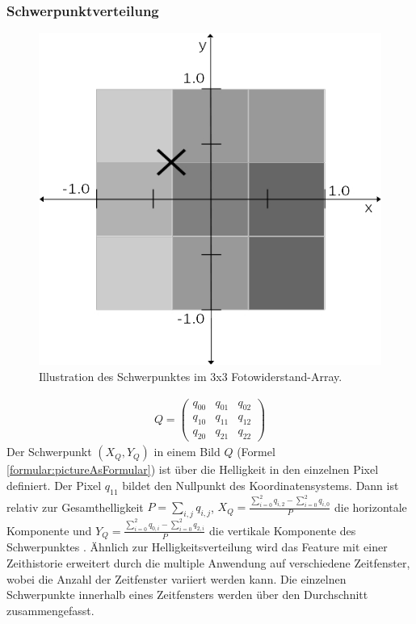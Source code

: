 \subsubsection{Schwerpunktverteilung}
\label{sec:schwerpunktverteilung}
\begin{figure}
    \centering
    \includegraphics[width=0.5\linewidth]{images/schwerpunkt_ansatz.jpg}
    \caption{Illustration des Schwerpunktes im 3x3 Fotowiderstand-Array.}
    \label{fig:schwerpunkt}
\end{figure}
\begin{align}
    Q = \begin{pmatrix}
            q_{00} & q_{01} & q_{02} \\
            q_{10} & q_{11} & q_{12} \\
            q_{20} & q_{21} & q_{22}
    \end{pmatrix}
    \label{formular:pictureAsFormular}
\end{align}
Der Schwerpunkt $(X_Q, Y_Q)$ in einem Bild $Q$ (Formel \ref{formular:pictureAsFormular}) ist über die Helligkeit in den einzelnen Pixel definiert. Der Pixel $q_{11}$ bildet den Nullpunkt des Koordinatensystems.
Dann ist relativ zur Gesamthelligkeit $P = \sum_{i,j} q_{i,j}$, $X_Q=\frac{\sum_{i=0}^{2} q_{i,2} - \sum_{i=0}^{2} q_{i,0}}{P}$ die horizontale Komponente
und $Y_Q = \frac{\sum_{i=0}^{2} q_{0,i} - \sum_{i=0}^{2} q_{2,i}}{P}$ die vertikale Komponente des Schwerpunktes \cite{schwerpunktAnsatz}.
\newline
\newline
Ähnlich zur Helligkeitsverteilung wird das Feature mit einer Zeithistorie erweitert durch die multiple Anwendung auf verschiedene Zeitfenster, wobei die Anzahl der Zeitfenster variiert werden kann. Die
einzelnen Schwerpunkte innerhalb eines Zeitfensters werden über den Durchschnitt zusammengefasst.
\newline
\newline
